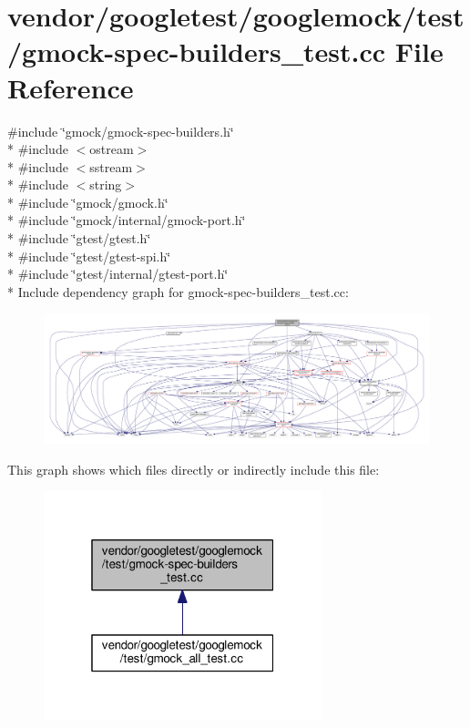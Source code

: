 \hypertarget{gmock-spec-builders__test_8cc}{}\section{vendor/googletest/googlemock/test/gmock-\/spec-\/builders\+\_\+test.cc File Reference}
\label{gmock-spec-builders__test_8cc}
{\ttfamily \#include \char`\"{}gmock/gmock-\/spec-\/builders.\+h\char`\"{}}\\*
{\ttfamily \#include $<$ostream$>$}\\*
{\ttfamily \#include $<$sstream$>$}\\*
{\ttfamily \#include $<$string$>$}\\*
{\ttfamily \#include \char`\"{}gmock/gmock.\+h\char`\"{}}\\*
{\ttfamily \#include \char`\"{}gmock/internal/gmock-\/port.\+h\char`\"{}}\\*
{\ttfamily \#include \char`\"{}gtest/gtest.\+h\char`\"{}}\\*
{\ttfamily \#include \char`\"{}gtest/gtest-\/spi.\+h\char`\"{}}\\*
{\ttfamily \#include \char`\"{}gtest/internal/gtest-\/port.\+h\char`\"{}}\\*
Include dependency graph for gmock-\/spec-\/builders\+\_\+test.cc\+:\nopagebreak
\begin{figure}[H]
\begin{center}
\leavevmode
\includegraphics[width=350pt]{gmock-spec-builders__test_8cc__incl}
\end{center}
\end{figure}
This graph shows which files directly or indirectly include this file\+:\nopagebreak
\begin{figure}[H]
\begin{center}
\leavevmode
\includegraphics[width=229pt]{gmock-spec-builders__test_8cc__dep__incl}
\end{center}
\end{figure}
